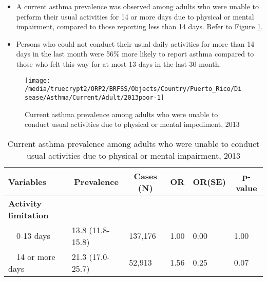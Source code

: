  \newpage
\begin{itemize}

\item A  
current asthma prevalence was observed among adults who were unable to perform their usual activities for 14 or more days due to physical or mental impairment, compared to those reporting less than 14 days. Refer to Figure \ref{fig:poor.Asthma.2013}.



\item Persons who could not conduct their usual daily activities for more than 14 days in the last month were 56\% more likely to report asthma compared to those who felt this way for at most 13 days in the last 30 month.

\end{itemize}

\begin{figure}[H]
\caption{Current asthma prevalence among adults who were unable to conduct usual activities due to physical or mental impediment, 2013}
\label{fig:poor.Asthma.2013}

\begin{knitrout}
\color{fgcolor}

{\centering \texttt{[image: /media/truecrypt2/ORP2/BRFSS/Objects/Country/Puerto\_Rico/Disease/Asthma/Current/Adult/2013poor-1]} 

}



\end{knitrout}
\end{figure}

\begin{table}[H]
\caption{Current asthma prevalence among adults who were unable to conduct usual activities due to physical or mental impairment, 2013\label{tab:poor.Asthma.2013}} 
\begin{center}
\begin{tabular}{llllll}
\hline\hline
\multicolumn{1}{l}{Variables}&\multicolumn{1}{c}{Prevalence}&\multicolumn{1}{c}{Cases (N)}&\multicolumn{1}{c}{OR}&\multicolumn{1}{c}{OR(SE)}&\multicolumn{1}{c}{p-value}\tabularnewline
\hline
{\bfseries Activity limitation}&&&&&\tabularnewline
~~0-13 days&13.8 (11.8-15.8)&137,176&1.00&0.00&1.00\tabularnewline
~~14 or more days&21.3 (17.0-25.7)& 52,913&1.56&0.25&0.07\tabularnewline
\hline
\end{tabular}\end{center}

\end{table}


